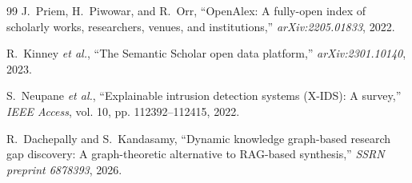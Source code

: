 \documentclass[conference,10pt]{IEEEtran}
\begin{document}
\begin{thebibliography}{99}
J.~Priem, H.~Piwowar, and R.~Orr, ``OpenAlex: A fully-open index of scholarly works, researchers, venues, and institutions,'' \emph{arXiv:2205.01833}, 2022.

R.~Kinney \emph{et al.}, ``The Semantic Scholar open data platform,'' \emph{arXiv:2301.10140}, 2023.

S.~Neupane \emph{et al.}, ``Explainable intrusion detection systems (X-IDS): A survey,'' \emph{IEEE Access}, vol. 10, pp. 112392--112415, 2022.

R.~Dachepally and S.~Kandasamy, ``Dynamic knowledge graph-based research gap discovery: A graph-theoretic alternative to RAG-based synthesis,'' \emph{SSRN preprint 6878393}, 2026.

\end{thebibliography}
\end{document}
